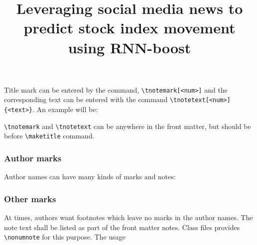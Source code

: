 \documentclass[a4paper,12pt]{article}
\begin{document}
Title mark can be entered by the command, \verb+\tnotemark[<num>]+
and the corresponding text can be entered with the command
\verb+\tnotetext[<num>]+ \verb+{<text>}+. An example will be:

\begin{vquote}
\title[mode=title]{Leveraging social media news to predict
                      stock index movement using RNN-boost}

\tnotemark[1,2]


\end{vquote}

\verb+\tnotemark+ and \verb+\tnotetext+ can be anywhere in
the front matter, but should be before \verb+\maketitle+ command.

\subsubsection{Author marks}

Author names can have many kinds of marks and notes:


\subsubsection{Other marks}

At times, authors want footnotes which leave no marks in
the author names. The note text shall be listed as part of
the front matter notes. Class files provides
\verb+\nonumnote+ for this purpose. The usage

\begin{vquote}
\end{vquote}
\end{document}
